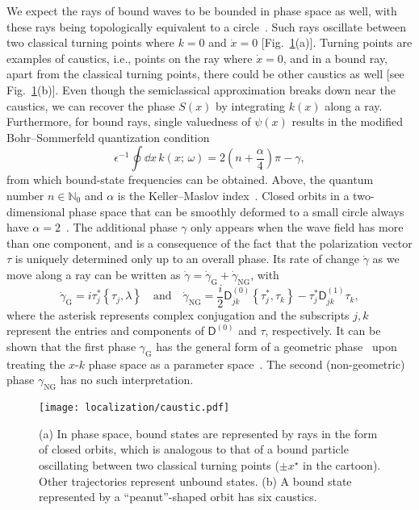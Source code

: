 We expect the rays of bound waves to be bounded in phase space as well, with these rays being topologically equivalent to a circle~\cite{keller1958,mcdonald1988}.
Such rays oscillate between two classical turning points where $k = 0$ and $\dot{x} = 0$ [Fig.~\ref{fig:caustic}(a)].
Turning points are examples of caustics, i.e., points on the ray where $\dot{x} = 0$, and in a bound ray, apart from the classical turning points, there could be other caustics as well [see Fig.~\ref{fig:caustic}(b)].
Even though the semiclassical approximation breaks down near the caustics, we can recover the phase $S(x)$ by integrating $k(x)$ along a ray.
Furthermore, for bound rays, single valuedness of $\psi(x)$ results in the modified Bohr--Sommerfeld quantization condition
%
\begin{equation}
  \epsilon^{-1}\oint \dd{x}\,k(x;\, \omega) = 2\left(n + \frac{\alpha}{4}\right)\pi - \gamma,
  \label{eq:quantization}
\end{equation}
%
from which bound-state frequencies can be obtained.
Above, the quantum number $n \in \mathbb{N}_{0}$ and $\alpha$ is the Keller--Maslov index~\cite{keller1958,maslov1981}.
Closed orbits in a two-dimensional phase space that can be smoothly deformed to a small circle always have $\alpha = 2$~\cite{percival1977}.
The additional phase $\gamma$ only appears when the wave field has more than one component, and is a consequence of the fact that the polarization vector $\tau$ is uniquely determined only up to an overall phase.
Its rate of change $\dot{\gamma}$ as we move along a ray can be written as $\dot{\gamma} = \dot{\gamma}_{\text{G}} + \dot{\gamma}_{\text{NG}}$, with~\cite{yabana1986,kaufman1987,venaille2023}
%
\begin{equation}
\dot{\gamma}_{\text{G}} = i\tau_{j}^{*}\left\{\tau_{j}, \lambda\right\} %
  \quad\text{and}\quad
  \dot{\gamma}_{\text{NG}} = \frac{i}{2}\mathsf{D}^{(0)}_{jk}\left\{\tau^{*}_{j}, \tau_{k}\right\} - \tau_{j}^{*}\mathsf{D}^{(1)}_{jk}\tau_{k},
  \label{eq:extra_phases}
\end{equation}
%
where the asterisk represents complex conjugation and the subscripts $j, k$ represent the entries and components of $\mathsf{D}^{(0)}$ and $\tau$, respectively.
It can be shown that the first phase $\gamma_{\text{G}}$ has the general form of a geometric phase~\cite{pancharatnam1956,berry1984} upon treating the $x$-$k$ phase space as a parameter space~\cite{yabana1986}.
The second (non-geometric) phase $\gamma_{\text{NG}}$ has no such interpretation.
%
\begin{figure}
  \begin{center}
    \texttt{[image: localization/caustic.pdf]}
  \end{center}
  \caption{%
    (a) In phase space, bound states are represented by rays in the form of closed orbits, which is analogous to that of a bound particle oscillating between two classical turning points ($\pm x^{\star}$ in the cartoon).
    Other trajectories represent unbound states.
    (b) A bound state represented by a ``peanut''-shaped orbit has six caustics.%
  }
  \label{fig:caustic}
\end{figure}
